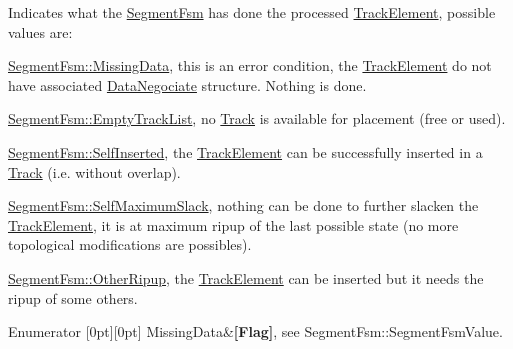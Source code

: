 Indicates what the \hyperlink{classKite_1_1SegmentFsm}{Segment\+Fsm} has done the processed \hyperlink{classKite_1_1TrackElement}{Track\+Element}, possible values are\+:
\begin{DoxyItemize}
\item \hyperlink{classKite_1_1SegmentFsm_a5d74787dedbc4e11c1ab15bf487e61f8a79ae4f26b8ed9c55b81f981bb5076e1d}{Segment\+Fsm\+::\+Missing\+Data}, this is an error condition, the \hyperlink{classKite_1_1TrackElement}{Track\+Element} do not have associated \hyperlink{classKite_1_1DataNegociate}{Data\+Negociate} structure. Nothing is done.
\item \hyperlink{classKite_1_1SegmentFsm_a5d74787dedbc4e11c1ab15bf487e61f8a13ac7e0722ca806ff25d8fa9220e980b}{Segment\+Fsm\+::\+Empty\+Track\+List}, no \hyperlink{classKite_1_1Track}{Track} is available for placement (free or used).
\item \hyperlink{classKite_1_1SegmentFsm_a5d74787dedbc4e11c1ab15bf487e61f8a8c564779c81599aaadbe879fa2b08d92}{Segment\+Fsm\+::\+Self\+Inserted}, the \hyperlink{classKite_1_1TrackElement}{Track\+Element} can be successfully inserted in a \hyperlink{classKite_1_1Track}{Track} (i.\+e. without overlap).
\item \hyperlink{classKite_1_1SegmentFsm_a5d74787dedbc4e11c1ab15bf487e61f8a560766bb79539564fdeda432c8efae6d}{Segment\+Fsm\+::\+Self\+Maximum\+Slack}, nothing can be done to further slacken the \hyperlink{classKite_1_1TrackElement}{Track\+Element}, it is at maximum ripup of the last possible state (no more topological modifications are possibles).
\item \hyperlink{classKite_1_1SegmentFsm_a5d74787dedbc4e11c1ab15bf487e61f8a22374bab829fac7d12af4784d80eeb6e}{Segment\+Fsm\+::\+Other\+Ripup}, the \hyperlink{classKite_1_1TrackElement}{Track\+Element} can be inserted but it needs the ripup of some others. 
\end{DoxyItemize}\begin{DoxyEnumFields}{Enumerator}
[0pt][0pt]{}\mbox{\label{classKite_1_1SegmentFsm_a5d74787dedbc4e11c1ab15bf487e61f8a79ae4f26b8ed9c55b81f981bb5076e1d}} 
Missing\+Data&{\bfseries \mbox{[}Flag\mbox{]}}, see Segment\+Fsm\+::\+Segment\+Fsm\+Value. \\
\hline


\end{DoxyEnumFields}
